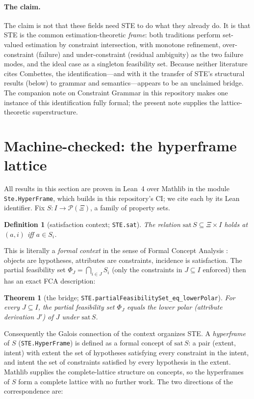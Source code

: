 \documentclass[11pt]{article}
\newtheorem{theorem}{Theorem}
\newtheorem{definition}{Definition}
\newcommand{\lean}[1]{\texttt{#1}}
\begin{document}
\paragraph{The claim.}
The claim is not that these fields need STE to do what they already do.
It is that STE is the common estimation-theoretic \emph{frame}: both
traditions perform set-valued estimation by constraint intersection,
with monotone refinement, over-constraint (failure) and
under-constraint (residual ambiguity) as the two failure modes, and the
ideal case as a singleton feasibility set.  Because neither literature
cites Combettes, the identification---and with it the transfer of STE's
structural results (below) to grammar and semantics---appears to be an
unclaimed bridge.  The companion note on Constraint Grammar in this
repository makes one instance of this identification fully formal; the
present note supplies the lattice-theoretic superstructure.

\section{Machine-checked: the hyperframe lattice}
\label{sec:hyperframe}

All results in this section are proven in Lean~4 over
Mathlib \citep{mathlib2020} in the module \lean{Ste.HyperFrame}, which
builds in this repository's CI; we cite each by its Lean identifier.
Fix $S : I \to \mathcal P(\Xi)$, a family of property sets.

\begin{definition}[satisfaction context; \lean{STE.sat}]
The relation $\mathrm{sat}\,S \subseteq \Xi \times I$ holds at $(a,i)$
iff $a \in S_i$.
\end{definition}

This is literally a \emph{formal context} in the sense of Formal
Concept Analysis \citep{ganter1999fca}: objects are hypotheses,
attributes are constraints, incidence is satisfaction.  The partial
feasibility set $\Phi_J = \bigcap_{i \in J} S_i$ (only the constraints
in $J \subseteq I$ enforced) then has an exact FCA description:

\begin{theorem}[the bridge; \lean{STE.partialFeasibilitySet\_eq\_lowerPolar}]
For every $J \subseteq I$, the partial feasibility set $\Phi_J$ equals
the lower polar (attribute derivation $J'$) of $J$ under
$\mathrm{sat}\,S$.
\end{theorem}

Consequently the Galois connection of the context organizes STE.  A
\emph{hyperframe} of $S$ (\lean{STE.HyperFrame}) is defined as a formal
concept of $\mathrm{sat}\,S$: a pair (extent, intent) with extent the
set of hypotheses satisfying every constraint in the intent, and intent
the set of constraints satisfied by every hypothesis in the extent.
Mathlib supplies the complete-lattice structure on concepts, so the
hyperframes of $S$ form a complete lattice with no further work.
The two directions of the correspondence are:
\end{document}
